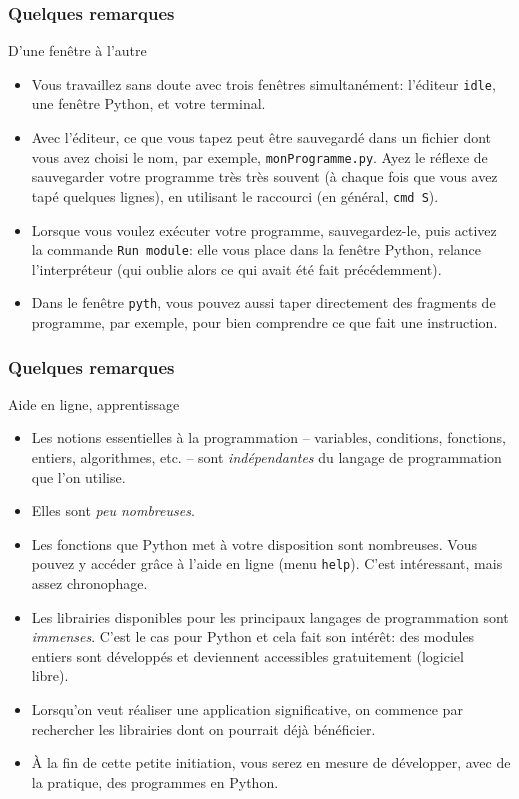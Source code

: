 \documentclass{beamer}
\newcommand{\mypause}{~}
\newcommand{\pyth}{{\sc Python}}
\newcommand{\prog}[1]{\alert{\texttt{#1}}}
\begin{document}

\frame
{
\frametitle{Quelques remarques}
{\footnotesize
\begin{block}{D'une fenêtre à l'autre}\mypause{}
\begin{itemize}
\item
Vous travaillez sans doute avec trois fenêtres simultanément: l'éditeur \prog{idle},
une fenêtre \pyth{}, et votre terminal.\mypause{}
\item
Avec l'éditeur, ce que vous tapez peut être sauvegardé dans un fichier 
dont vous avez choisi le nom, par exemple, \prog{monProgramme.py}.
Ayez le réflexe de sauvegarder votre programme très très souvent (à chaque fois
que vous avez tapé quelques lignes), en utilisant le raccourci (en général, \prog{cmd S}).\mypause{}
\item
Lorsque vous voulez exécuter votre programme, sauvegardez-le, puis activez
la commande \prog{Run module}: elle vous place dans la fenêtre \pyth{}, relance
l'interpréteur (qui oublie alors ce qui avait été fait précédemment).\mypause{}
\item
Dans le fenêtre \prog{pyth}, vous pouvez aussi taper directement des 
fragments de programme, par exemple, pour bien comprendre ce que 
fait une instruction. 
\end{itemize}
\end{block}
}
}

\frame
{
\frametitle{Quelques remarques}
{\footnotesize
\begin{block}{Aide en ligne, apprentissage}\mypause{}
\begin{itemize}
\item Les notions essentielles à la programmation -- variables, conditions, fonctions, entiers, algorithmes, etc. --
sont \alert{\em indépendantes} du langage de programmation que l'on utilise.\mypause{}
\item Elles sont \alert{\em peu nombreuses}.\mypause{}
\item Les fonctions que \pyth{} met à votre disposition sont nombreuses. Vous pouvez y accéder
grâce à l'aide en ligne (menu \prog{help}). C'est intéressant, mais assez chronophage.\mypause{}
\item Les librairies disponibles pour les principaux langages de programmation sont \alert{\em immenses}.
C'est le cas pour \pyth{} et cela fait son intérêt: des modules entiers sont développés et deviennent
accessibles gratuitement (logiciel libre).\mypause{}
\item Lorsqu'on veut réaliser une application significative, on commence par rechercher les 
librairies dont on pourrait déjà bénéficier. \mypause{}
\item À la fin de cette petite initiation, vous serez en mesure de développer, avec de la pratique, 
des programmes en \pyth{}. 
\end{itemize}
\end{block}
}
}
\end{document}
